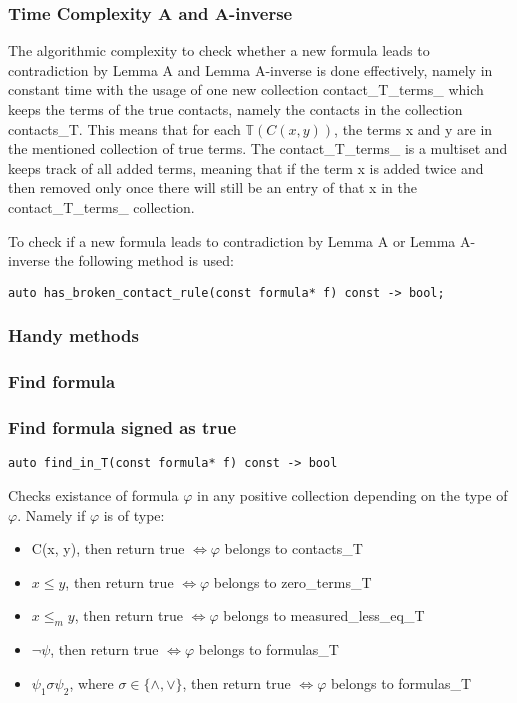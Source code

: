 \documentclass{article}
\begin{document}
			\subsubsection*{Time Complexity A and A-inverse} 
				The algorithmic complexity to check whether a new formula leads to contradiction by Lemma A and Lemma A-inverse is done
				effectively, namely in constant time with the usage of one new collection contact\_T\_terms\_ which keeps the terms of 
				the true contacts, namely the contacts in the collection contacts\_T. This means that for each $\mathbb{T}(C(x, y))$, the 
				terms x and y are in the mentioned collection of true terms. The contact\_T\_terms\_  is a multiset and keeps track 
				of all added terms, meaning that if the term x is added twice and then removed only once there will still be an entry of 
				that x in the contact\_T\_terms\_ collection.
				
				To check if a new formula leads to contradiction by Lemma A or Lemma A-inverse the following method is used:
				\begin{lstlisting}
auto has_broken_contact_rule(const formula* f) const -> bool;
				\end{lstlisting}

			\subsubsection{Handy methods}
			\subsubsection*{Find formula}
			\subsubsection*{Find formula signed as true}
				\begin{lstlisting}
auto find_in_T(const formula* f) const -> bool
				\end{lstlisting}
                			Checks existance of formula $\varphi$ in any positive collection depending on the type of $\varphi$.
                			Namely if $\varphi$ is of type:
                			\begin{itemize}
                    				\item C(x, y), then return true $\iff \varphi$ belongs to contacts\_T
                    				\item $x \le y$, then return true $\iff \varphi$ belongs to zero\_terms\_T
                    				\item $x \le_m y$, then return true $\iff \varphi$ belongs to measured\_less\_eq\_T
                    				\item $\neg \psi$, then return true $\iff \varphi$ belongs to formulas\_T
                    				\item $\psi_1 \sigma \psi_2$, where $\sigma \in \{\wedge, \vee\}$, then return true $\iff \varphi$ belongs to formulas\_T
                			\end{itemize}
\end{document}
